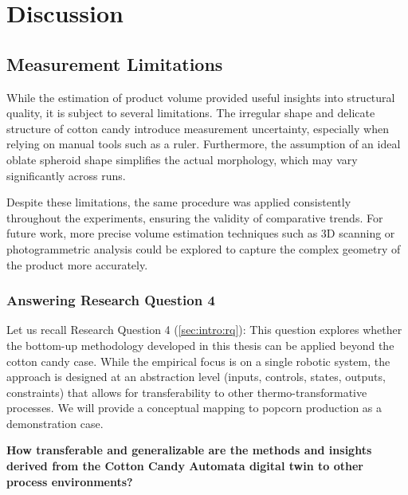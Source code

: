 \chapter{Discussion}
\label{sec:discussion}

\section{Measurement Limitations}

While the estimation of product volume provided useful insights into structural quality, it is subject to several limitations. The irregular shape and delicate structure of cotton candy introduce measurement uncertainty, especially when relying on manual tools such as a ruler. Furthermore, the assumption of an ideal oblate spheroid shape simplifies the actual morphology, which may vary significantly across runs.

Despite these limitations, the same procedure was applied consistently throughout the experiments, ensuring the validity of comparative trends. For future work, more precise volume estimation techniques such as 3D scanning or photogrammetric analysis could be explored to capture the complex geometry of the product more accurately.

\subsection*{Answering Research Question 4}
Let us recall Research Question 4 (\ref{sec:intro:rq}): This question explores whether the bottom-up methodology developed in this thesis can be applied beyond the cotton candy case. While the empirical focus is on a single robotic system, the approach is designed at an abstraction level (inputs, controls, states, outputs, constraints) that allows for transferability to other thermo-transformative processes. We will provide a conceptual mapping to popcorn production as a demonstration case.

\textbf{How transferable and generalizable are the methods and insights derived from the Cotton Candy Automata digital twin to other process environments?}

